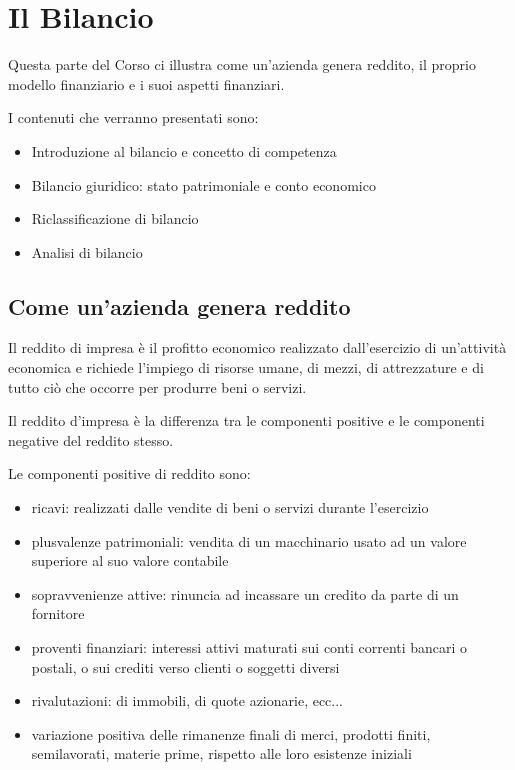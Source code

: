 \section{Il Bilancio}
Questa parte del Corso ci illustra come un'azienda genera reddito, il proprio modello finanziario e i suoi aspetti finanziari.

I contenuti che verranno presentati sono:
\begin{itemize}
	\item Introduzione al bilancio e concetto di competenza
	\item Bilancio giuridico: stato patrimoniale e conto economico
	\item Riclassificazione di bilancio
	\item Analisi di bilancio
\end{itemize}

\subsection{Come un'azienda genera reddito}
Il reddito di impresa è il profitto economico realizzato dall’esercizio di un’attività economica e richiede l’impiego di risorse umane, di mezzi, di attrezzature e di tutto ciò che occorre per produrre beni o servizi.

Il reddito d’impresa è la differenza tra le componenti positive e le componenti negative del reddito stesso.

Le componenti positive di reddito sono:
\begin{itemize}
	\item ricavi: realizzati dalle vendite di beni o servizi durante l’esercizio
	\item plusvalenze patrimoniali: vendita di un macchinario usato ad un valore superiore al suo valore contabile
	\item sopravvenienze attive: rinuncia ad incassare un credito da parte di un fornitore
	\item proventi finanziari: interessi attivi maturati sui conti correnti bancari o postali, o sui crediti verso clienti o soggetti diversi
	\item rivalutazioni: di immobili, di quote azionarie, ecc...
	\item variazione positiva delle rimanenze finali di merci, prodotti finiti, semilavorati, materie prime, rispetto alle loro esistenze iniziali
\end{itemize}

